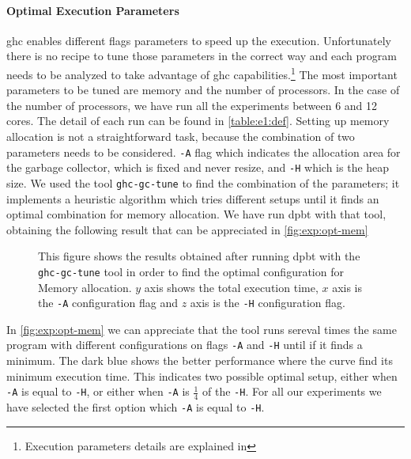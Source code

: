 \paragraph{Optimal Execution Parameters}\label{par:ex:param} \acrshort{ghc} enables different flags parameters to speed up the execution. Unfortunately there is no recipe to tune those parameters in the correct way and each program needs to be analyzed to take advantage of \acrshort{ghc} capabilities.\footnote{Execution parameters details are explained in }
The most important parameters to be tuned are memory and the number of processors. In the case of the number of processors, we have run all the experiments between 6 and 12 cores. The detail of each run can be found in \autoref{table:e1:def}.
Setting up memory allocation is not a straightforward task, because the combination of two parameters needs to be considered. \texttt{-A} flag which indicates the allocation area for the garbage collector, which is fixed and never resize, and \texttt{-H} which is the heap size. We  used the tool \texttt{ghc-gc-tune} \cite{ghctune} to find the combination of the parameters; 
it implements a heuristic algorithm which tries different setups until it finds an optimal combination for memory allocation.
We have run \acrshort{dpbt} with that tool, obtaining the following result that can be appreciated in \autoref{fig:exp:opt-mem}

\begin{figure}[h!]
  \centering  
\caption[{[EE] $\dpbt$ Finding Optimal Memory Setup}]{This figure shows the results obtained after running \acrshort{dpbt} with the \texttt{ghc-gc-tune} tool in order to find the optimal configuration for Memory allocation. $y$ axis shows the total execution time, $x$ axis is the \texttt{-A} configuration flag and $z$ axis is the \texttt{-H} configuration flag.}
\label{fig:exp:opt-mem}
\end{figure}

In \autoref{fig:exp:opt-mem} we can appreciate that the tool runs sereval times the same program with different configurations on flags \texttt{-A} and \texttt{-H} until if it finds a minimum. The dark blue shows the better performance where the curve find its minimum execution time. 
This indicates two possible optimal setup, either when \texttt{-A} is equal to \texttt{-H}, or either when \texttt{-A} is $\frac{1}{4}$ of the \texttt{-H}. For all our experiments we have selected the first option which \texttt{-A} is equal to \texttt{-H}.

